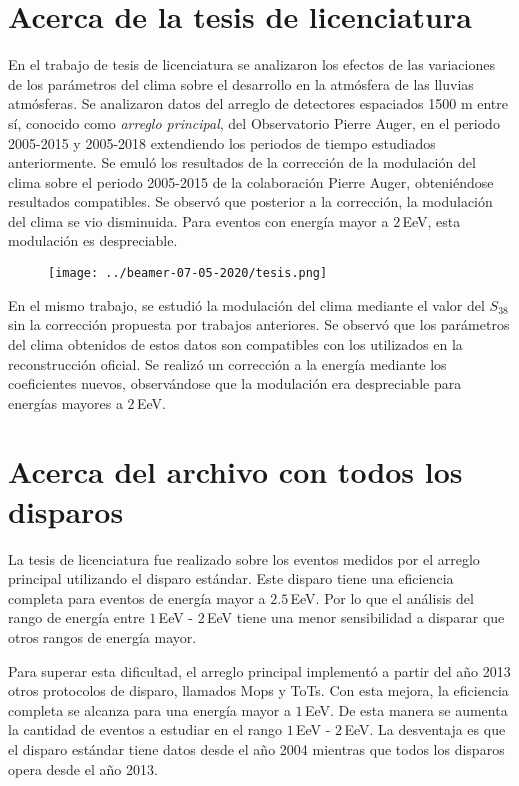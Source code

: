 \section{Acerca de la tesis de licenciatura}




En el trabajo de tesis de licenciatura se analizaron los efectos de las variaciones de los parámetros del clima sobre el desarrollo en la atmósfera de las lluvias atmósferas. Se analizaron datos del arreglo de detectores espaciados 1500 m entre sí, conocido como \emph{arreglo principal}, del Observatorio Pierre Auger, en el periodo 2005-2015 y 2005-2018 extendiendo los periodos de tiempo estudiados anteriormente. Se emuló los resultados de la corrección de la modulación del clima sobre el periodo 2005-2015 de la colaboración Pierre Auger, obteniéndose resultados compatibles. Se observó que posterior a la corrección, la modulación del clima se vio disminuida. Para eventos con energía mayor a $2\,$EeV, esta modulación es despreciable.
  \begin{figure}[H]
    \centering
    \texttt{[image: ../beamer-07-05-2020/tesis.png]}
  \end{figure}
En el mismo trabajo, se estudió la modulación del clima mediante el valor del $S_{38}$ sin la corrección propuesta por trabajos anteriores. Se observó que los parámetros del clima obtenidos de estos datos son compatibles con los utilizados en la reconstrucción oficial. Se realizó un corrección a  la energía mediante los coeficientes nuevos, observándose que la modulación era despreciable para energías mayores a $2\,$EeV. 

\section{Acerca del archivo con todos los disparos}

La tesis de licenciatura fue realizado sobre los eventos medidos por el arreglo principal utilizando el disparo estándar. Este disparo tiene una eficiencia completa para eventos de energía mayor a $2.5\,$EeV. Por lo que el análisis del rango de energía entre $1\,$EeV - $2\,$EeV tiene una menor sensibilidad a disparar que otros rangos de energía mayor.

Para superar esta dificultad, el arreglo principal implementó a partir del año 2013 otros protocolos de disparo, llamados Mops y ToTs. Con esta mejora, la eficiencia completa se alcanza para una energía mayor a $1\,$EeV. De esta manera se aumenta la cantidad de eventos a estudiar en el rango $1\,$EeV - $2\,$EeV. La desventaja es que el disparo estándar tiene datos desde el año 2004 mientras que todos los disparos opera desde el año 2013.
   

